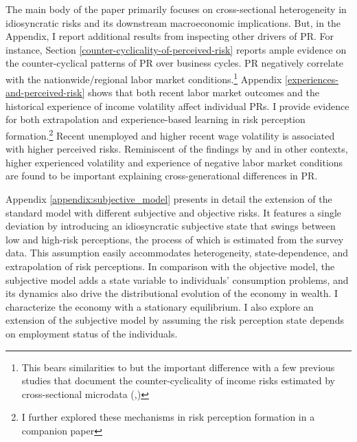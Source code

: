 The main body of the paper primarily focuses on cross-sectional heterogeneity in idiosyncratic risks and its downstream macroeconomic implications. But, in the Appendix, I report additional results from inspecting other drivers of PR. For instance, Section \ref{counter-cyclicality-of-perceived-risk} reports ample evidence on the counter-cyclical patterns of PR over business cycles. PR negatively correlate with the nationwide/regional labor market conditions.\footnote{This bears similarities to but the important difference with a few previous studies that document the counter-cyclicality of income risks estimated by cross-sectional microdata (\cite{guvenen2014nature},\cite{catherine_countercyclical_2019})} Appendix \ref{experiences-and-perceived-risk} shows that both recent labor market outcomes and the historical experience of income volatility affect individual PRs. I provide evidence for both extrapolation and experience-based learning in risk perception formation.\footnote{I further explored these mechanisms in risk perception formation in a companion paper} Recent unemployed and higher recent wage volatility is associated with higher perceived risks. Reminiscent of the findings by \cite{malmendier2015learning} and \cite{kuchler2019personal} in other contexts, higher experienced volatility and experience of negative labor market conditions are found to be important explaining cross-generational differences in PR. 

Appendix \ref{appendix:subjective_model} presents in detail the extension of the standard model with different subjective and objective risks. It features a single deviation by introducing an idiosyncratic subjective state that swings between low and high-risk perceptions, the process of which is estimated from the survey data. This assumption easily accommodates heterogeneity, state-dependence, and extrapolation of risk perceptions. In comparison with the objective model, the subjective model adds a state variable to individuals' consumption problems, and its dynamics also drive the distributional evolution of the economy in wealth. I characterize the economy with a stationary equilibrium. I also explore an extension of the subjective model by assuming the risk perception state depends on employment status of the individuals. 
 
 



